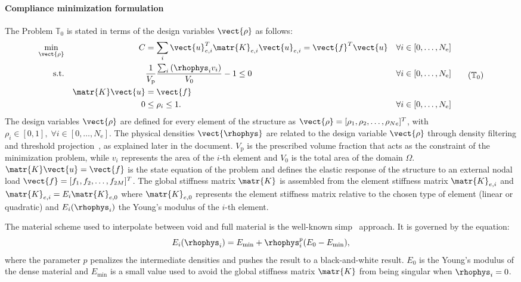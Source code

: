 \paragraph{Compliance minimization formulation} The Problem $\mathbb{T}_0$ is stated in terms of the design variables $\vect{\rho}$ as follows:
\begin{equation}
    \begin{aligned}
    \min_{\vect{\rho}}         && C &= \sum_{i} \vect{u}_{e,i}^T \matr{K}_{e,i} \vect{u}_{e,i}=\vect{f}^T\vect{u}&& \forall i \in [0,\dots,N_\text{e}]                         \\
    \textrm{s.t.}   && & \frac{1}{V_\text{p}}\frac{\sum_{i} \left(\rhophys_i v_i \right)}{V_0} - 1 \leq 0 && \forall i \in [0,\dots,N_\text{e}] \\
    && \matr{K}\vect{u} &= \vect{f} &&\\
    && 0 &\leq \rho_i \leq 1. && \forall i \in [0,\dots,N_\text{e}] \\
    \end{aligned}
    \tag{$\mathbb{T}_0$}
    \label{eq:02_prob-comp}
\end{equation}
The design variables $\vect{\rho}$ are defined for every element of the structure as $\vect{\rho} = [\rho_1, \rho_2, \ldots,\rho_{Ne}]^T$, with $\rho_i \in [0,1], \; \forall i \in [0,\dots,N_\text{e}]$. The physical densities $\vect{\rhophys}$ are related to the design variable $\vect{\rho}$ through density filtering and threshold projection~, as explained later in the document. $V_\text{p}$ is the prescribed volume fraction that acts as the constraint of the minimization problem, while $v_i$ represents the area of the $i$-th element and $V_0$ is the total area of the domain $\Omega$. $\matr{K}\vect{u} = \vect{f}$ is the state equation of the problem and defines the elastic response of the structure to an external nodal load $\vect{f}=[f_1, f_2, \ldots,f_{2M}]^T$. The global stiffness matrix $\matr{K}$ is assembled from the element stiffness matrix $\matr{K}_{e,i}$ and $\matr{K}_{e,i} = E_i \matr{K}_{e,0}$ where $\matr{K}_{e,0}$ represents the element stiffness matrix relative to the chosen type of element (linear or quadratic) and $E_i(\rhophys_i)$ the Young's modulus of the $i$-th element. 

The material scheme used to interpolate between void and full material is the well-known \gls{simp}~ approach. It is governed by the equation:
\begin{equation}
    E_i(\rhophys_i) = E_{\textrm{min}} + \rhophys_i^p(E_0-E_{\textrm{min}}),
    \label{eq:02_simp}
\end{equation}
where the parameter $p$ penalizes the intermediate densities and pushes the result to a black-and-white result. $E_0$ is the Young's modulus of the dense material and $E_{\textrm{min}}$ is a small value used to avoid the global stiffness matrix $\matr{K}$ from being singular when $\rhophys_i=0$. 


